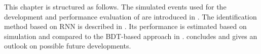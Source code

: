 This chapter is structured as follows. The simulated events used for
the development and performance evaluation of \tauid are introduced in
. The identification method based on RNN is
described in . Its performance is estimated based
on simulation and compared to the BDT-based approach in
.   concludes and
gives an outlook on possible future developments.

